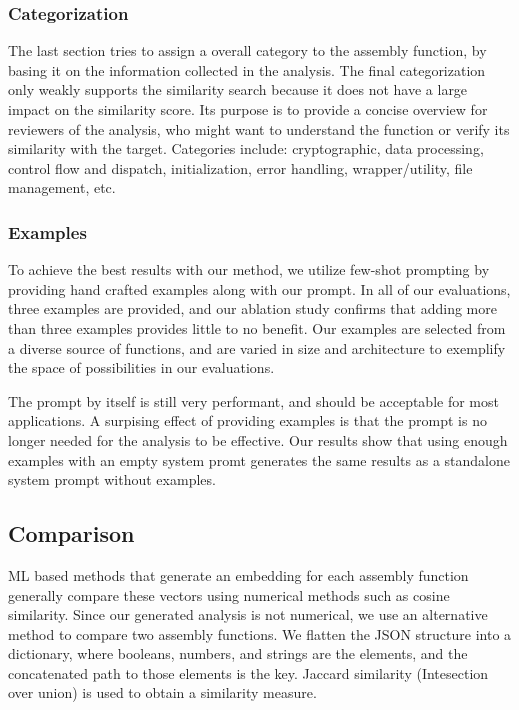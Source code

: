 \documentclass[conference,compsoc]{IEEEtran}
\begin{document}
\subsubsection{Categorization}

The last section tries to assign a overall category to the assembly function, by basing it on the information
collected in the analysis. The final categorization only weakly supports the similarity search because it does
not have a large impact on the similarity score. Its purpose is to provide a concise overview for reviewers
of the analysis, who might want to understand the function or verify its similarity with the target.
Categories include: cryptographic, data processing, control flow and dispatch, initialization, error handling,
wrapper/utility, file management, etc.

\subsubsection{Examples}

To achieve the best results with our method, we utilize few-shot prompting by providing hand crafted examples along with our prompt.
In all of our evaluations, three examples are provided, and our ablation study confirms that adding more than three examples provides
little to no benefit. Our examples are selected from a diverse source of functions, and are varied in size and architecture to
exemplify the space of possibilities in our evaluations.

The prompt by itself is still very performant, and should be acceptable for most applications. A surpising effect of providing examples
is that the prompt is no longer needed for the analysis to be effective. Our results show that using enough examples with an empty system promt
generates the same results as a standalone system prompt without examples.

\subsection{Comparison}

ML based methods that generate an embedding for each assembly function generally compare these vectors using numerical
methods such as cosine similarity.  Since our generated analysis is not numerical, we use an alternative
method to compare two assembly functions.  We flatten the JSON structure into a dictionary, where booleans, numbers, and
strings are the elements, and the concatenated path to those elements is the key.  Jaccard similarity (Intesection over union)
is used to obtain a similarity measure.
\end{document}

